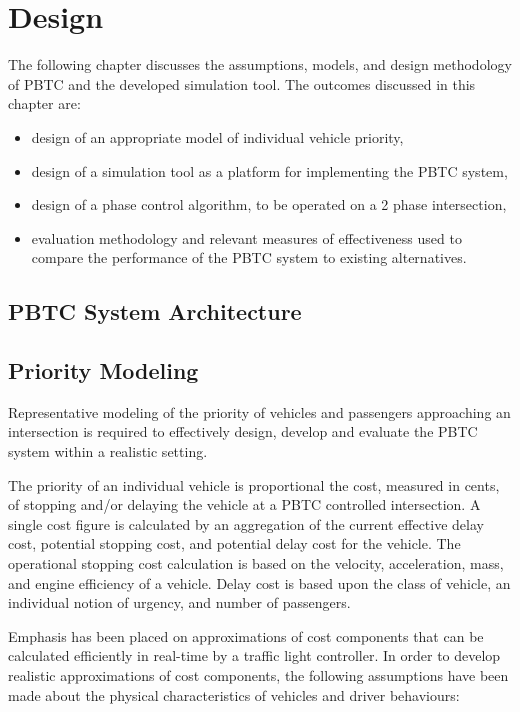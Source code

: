 \chapter{Design}

The following chapter discusses the assumptions, models, and design methodology of PBTC and the developed simulation tool. The outcomes discussed in this chapter are:

\begin{itemize}
\item design of an appropriate model of individual vehicle priority,
\item design of a simulation tool as a platform for implementing the PBTC system,
\item design of a phase control algorithm, to be operated on a 2 phase intersection,
\item evaluation methodology and relevant measures of effectiveness used to compare the performance of the PBTC system to existing alternatives.
\end{itemize}

\section{PBTC System Architecture}

\section{Priority Modeling}

Representative modeling of the priority of vehicles and passengers approaching an intersection is required to effectively design, develop and evaluate the PBTC system within a realistic setting. 

The priority of an individual vehicle is proportional the cost, measured in cents, of stopping and/or delaying the vehicle at a PBTC controlled intersection. A single cost figure is calculated by an aggregation of the current effective delay cost, potential stopping cost, and potential delay cost for the vehicle. The operational stopping cost calculation is based on the velocity, acceleration, mass, and engine efficiency of a vehicle. Delay cost is based upon the class of vehicle, an individual notion of urgency, and number of passengers.

Emphasis has been placed on approximations of cost components that can be calculated efficiently in real-time by a traffic light controller. In order to develop realistic approximations of cost components, the following assumptions have been made about the physical characteristics of vehicles and driver behaviours:

